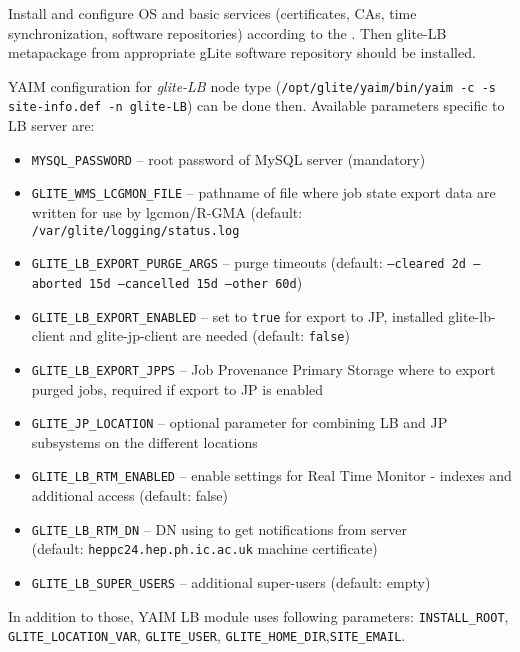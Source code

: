 Install and configure OS and basic services (certificates, CAs, time synchronization, software repositories) according to the . Then glite-LB metapackage from appropriate gLite software repository should be installed.

YAIM configuration for \emph{glite-LB} node type 
(\texttt{/opt/glite/yaim/bin/yaim -c -s site-info.def -n glite-LB}) 
can be done then. Available parameters specific to LB server are:

\begin{itemize}
\item \texttt{MYSQL\_PASSWORD} -- root password of MySQL server (mandatory)
\item \texttt{GLITE\_WMS\_LCGMON\_FILE} -- pathname of file where job state
export data are written for use by lgcmon/R-GMA 
(default: \texttt{/var/glite/logging/status.log}
\item \texttt{GLITE\_LB\_EXPORT\_PURGE\_ARGS} -- purge timeouts (default: \texttt{--cleared 2d --aborted 15d --cancelled 15d --other 60d})
\item \texttt{GLITE\_LB\_EXPORT\_ENABLED} -- set to \texttt{true} for export to JP, installed glite-lb-client and glite-jp-client are needed (default: \texttt{false})
\item \texttt{GLITE\_LB\_EXPORT\_JPPS} -- Job Provenance Primary Storage where to export purged jobs, required if export to JP is enabled
\item \texttt{GLITE\_JP\_LOCATION} -- optional parameter for combining LB and JP subsystems on the different locations
\item \texttt{GLITE\_LB\_RTM\_ENABLED} -- enable settings for Real Time Monitor - indexes and additional access (default: false)
\item \texttt{GLITE\_LB\_RTM\_DN} -- DN using to get notifications from \LB server\\
(default: \texttt{heppc24.hep.ph.ic.ac.uk} machine certificate)
\item \texttt{GLITE\_LB\_SUPER\_USERS} -- additional super-users (default: empty)
\end{itemize}

In addition to those, YAIM LB module uses following parameters:
\texttt{INSTALL\_ROOT}, \texttt{GLITE\_LOCATION\_VAR}, \texttt{GLITE\_USER}, \texttt{GLITE\_HOME\_DIR},\texttt{SITE\_EMAIL}.

